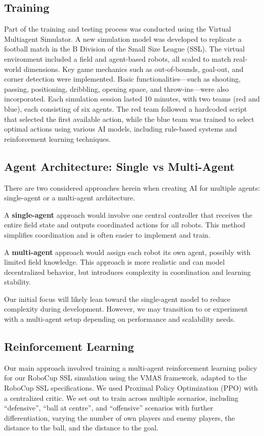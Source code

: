 \subsection{Training}
Part of the training and testing process was conducted using the Virtual Multiagent Simulator. A new simulation model was developed to replicate a football match in the B Division of the Small Size League (SSL). The virtual environment included a field and agent-based robots, all scaled to match real-world dimensions. Key game mechanics such as out-of-bounds, goal-out, and corner detection were implemented. Basic functionalities—such as shooting, passing, positioning, dribbling, opening space, and throw-ins—were also incorporated. Each simulation session lasted 10 minutes, with two teams (red and blue), each consisting of six agents. The red team followed a hardcoded script that selected the first available action, while the blue team was trained to select optimal actions using various AI models, including rule-based systems and reinforcement learning techniques.

\subsection{Agent Architecture: Single vs Multi-Agent}

There are two considered approaches herein when creating AI for multiple agents: single-agent or a multi-agent architecture.

A \textbf{single-agent} approach would involve one central controller that receives the entire field state and outputs coordinated actions for all robots. This method simplifies coordination and is often easier to implement and train.

A \textbf{multi-agent} approach would assign each robot its own agent, possibly with limited field knowledge. This approach is more realistic and can model decentralized behavior, but introduces complexity in coordination and learning stability.

Our initial focus will likely lean toward the single-agent model to reduce complexity during development. However, we may transition to or experiment with a multi-agent setup depending on performance and scalability needs.

\subsection{Reinforcement Learning}
Our main approach involved training a multi-agent reinforcement learning policy for our RoboCup SSL simulation using the VMAS framework, adapted to the RoboCup SSL specifications.  
We used Proximal Policy Optimization (PPO) with a centralized critic.  
We set out to train across multiple scenarios, including ``defensive'', ``ball at centre'', and ``offensive'' scenarios with further differentiation, varying the number of own players and enemy players, the distance to the ball, and the distance to the goal.

